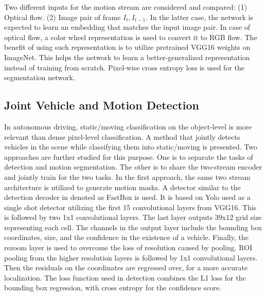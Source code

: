 \documentclass[letterpaper, 10 pt, conference]{ieeeconf}  %
\begin{document}
Two different inputs for the motion stream are considered and compared: (1) Optical flow. (2)  Image pair of frame $I_t, I_{t-1}$. In the latter case, the network is expected to learn an embedding that matches the input image pair. In case of optical flow, a color wheel representation is used to convert it to RGB flow\cite{baker2011database}. The benefit of using such representation is to utilize pretrained VGG16 weights on ImageNet. This helps the network to learn a better-generalized representation instead of training from scratch. Pixel-wise cross entropy loss is used for the segmentation network.

\subsection{Joint Vehicle and Motion Detection}
In autonomous driving, static/moving classification on the object-level is more relevant than dense pixel-level classification. A method that jointly detects vehicles in the scene while classifying them into static/moving is presented. Two approaches are further studied for this purpose. One is to separate the tasks of detection and motion segmentation. The other is to share the two-stream encoder and jointly train for the two tasks. In the first approach, the same two stream architecture is utilized to generate motion masks. A detector similar to the detection decoder in \cite{teichmann2016multinet} denoted as FastBox is used. It is based on Yolo \cite{redmon2016you} used as a single shot detector utilizing the first 15 convolutional layers from VGG16. This is followed by two 1x1 convolutional layers. The last layer outputs 39x12 grid size representing each cell. The channels in the output layer include the bounding box coordinates, size, and the confidence in the existence of a vehicle. Finally, the rezoom layer is used to overcome the loss of resolution caused by pooling. ROI pooling from the higher resolution layers is followed by 1x1 convolutional layers. Then the residuals on the coordinates are regressed over, for a more accurate localization. The loss function used in detection combines the L1 loss for the bounding box regression, with cross entropy for the confidence score. 
\end{document}
